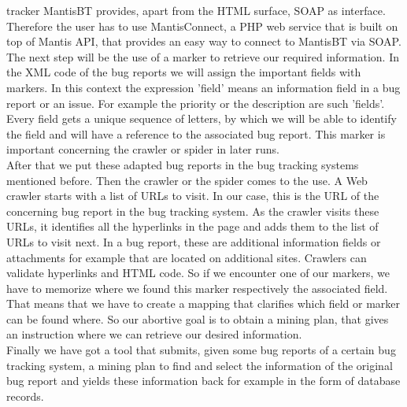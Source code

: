 \documentclass[12pt,a4paper,final]{article}
\begin{document}
tracker MantisBT provides, apart from the HTML surface, SOAP as interface. Therefore the user has to use MantisConnect, a PHP web service that is built on top of Mantis API, that provides an easy way to connect to MantisBT via SOAP.   \\ The next step will be the use of a marker to retrieve our required information. In the XML code of the bug reports we will assign the important fields with markers. In this context the expression 'field' means an information field in a bug report or an issue. For example the priority or the description are such 'fields'. Every field gets a unique sequence of letters, by which we will be able to identify the field and will have a reference to the associated bug report. This marker is important concerning the crawler or spider in later runs. \\After that we put these adapted bug reports in the bug tracking systems mentioned before. Then the crawler or the spider comes to the use. A Web crawler starts with a list of URLs to visit. In our case, this is the URL of the concerning bug report in the bug tracking system. As the crawler visits these URLs, it identifies all the hyperlinks in the page and adds them to the list of URLs to visit next. In a bug report, these are additional information fields or attachments for example that are located on additional sites. Crawlers can validate hyperlinks and HTML code. So if we encounter one of our markers, we have to memorize where we found this marker respectively the associated field. That means that we have to create a mapping that clarifies which field or marker can be found where. So our abortive goal is to obtain a mining plan, that gives an instruction where we can retrieve our desired information. \\ \pagebreak Finally we have got a tool that submits, given some bug reports of a certain bug tracking system, a mining plan to find and select the information of the original bug report and yields these information back for example in the form of database records. 
\end{document}
